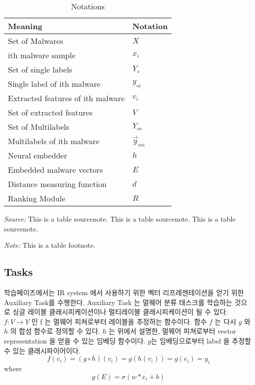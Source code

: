 \begin{table}%
\caption{Notations}
\label{tab:one}
\begin{minipage}{\columnwidth}
\begin{center}
\begin{tabular}{ll}
\toprule
Meaning & Notation\\
\midrule
  Set of Malwares     & $X$ \\
  ith malware sample  & $x_i$ \\
  Set of single labels & $Y_s$ \\
  Single label of ith malware    & $y_{si}$ \\
  Extracted features of ith malware & $v_i$ \\
  Set of extracted features   & $V$ \\
  Set of Multilabels   & $Y_m$ \\
  Multilabels of ith malware & $\vec{y}_{mi}$\\
  Neural embedder & $h$ \\
  Embedded malware vectors & $E$ \\
  Distance measuring function & $d$ \\
  Ranking Module & $R$\\
\bottomrule
\end{tabular}
\end{center}
\bigskip\centering
\footnotesize\emph{Source:} This is a table
 sourcenote. This is a table sourcenote. This is a table
 sourcenote.

 \emph{Note:} This is a table footnote.
\end{minipage}
\end{table}%



\subsection{Tasks}

학습페이즈에서는 IR system 에서 사용하기 위한 벡터 리프레젠테이션을 얻기 위한 Auxiliary Task를 수행한다. Auxiliary Task 는 멀웨어 분류 태스크를 학습하는 것으로 싱글 레이블 클래시피케이션이나 멀티레이블 클래시피케이션이 될 수 있다. $f: V \rightarrow Y $ 인 f 는 멀웨어 피쳐로부터 레이블을 추정하는 함수이다. 함수 $f$ 는 다시 $g$ 와 $h$ 의 합성 함수로 정의할 수 있다. $h$ 는 위에서 설명한, 멀웨어 피쳐로부터 vector representation 을 얻을 수 있는 임베딩 함수이다. $g$는 임베딩으로부터 label 을 추정할 수 있는 클래시파이어이다.  
\[
f(v_i) = (g \circ h)(v_i) = g(h(v_i)) = g(e_i) = y_i 
\]
where
\[
g(E) = \sigma (w*e_i + b) 
\]

